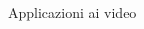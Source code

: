\documentclass[aspectratio=169]{beamer}
\begin{document}
\begin{frame}{Applicazioni ai video}
    \begin{columns}[T] %
        \begin{column}{.33\textwidth}
            \begin{center}
            \end{center}
        \end{column}%
        \begin{column}{.33\textwidth}
            \begin{center}
            \end{center}
        \end{column}%
        \begin{column}{.33\textwidth}
            \begin{center}

\end{center}
\end{column}
\end{columns}
\end{frame}
\end{document}
